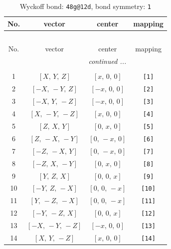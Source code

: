 \documentclass[fleqn,8pt]{jsarticle}
\begin{document}
\begin{longtable}{cccc}
\caption{Wyckoff bond: {\tt 48g@12d}, bond symmetry: {\tt 1}}
 \\
 \hline \hline
No. & vector & center & mapping \\ \hline \endfirsthead

\multicolumn{3}{l}{\tablename\ \thetable{}} \\
 \hline \hline
No. & vector & center & mapping \\ \hline \endhead

 \hline \hline
\multicolumn{3}{r}{\footnotesize\it continued ...} \\ \endfoot

 \hline \hline
\multicolumn{3}{r}{} \\ \endlastfoot

1 & $\left[ X,\, Y,\, Z \right]$ & $\left[ x,\, 0,\, 0 \right]$ & {\tt [1]} \\ \hline
2 & $\left[ - X,\, - Y,\, Z \right]$ & $\left[ - x,\, 0,\, 0 \right]$ & {\tt [2]} \\ \hline
3 & $\left[ - X,\, Y,\, - Z \right]$ & $\left[ - x,\, 0,\, 0 \right]$ & {\tt [3]} \\ \hline
4 & $\left[ X,\, - Y,\, - Z \right]$ & $\left[ x,\, 0,\, 0 \right]$ & {\tt [4]} \\ \hline
5 & $\left[ Z,\, X,\, Y \right]$ & $\left[ 0,\, x,\, 0 \right]$ & {\tt [5]} \\ \hline
6 & $\left[ Z,\, - X,\, - Y \right]$ & $\left[ 0,\, - x,\, 0 \right]$ & {\tt [6]} \\ \hline
7 & $\left[ - Z,\, - X,\, Y \right]$ & $\left[ 0,\, - x,\, 0 \right]$ & {\tt [7]} \\ \hline
8 & $\left[ - Z,\, X,\, - Y \right]$ & $\left[ 0,\, x,\, 0 \right]$ & {\tt [8]} \\ \hline
9 & $\left[ Y,\, Z,\, X \right]$ & $\left[ 0,\, 0,\, x \right]$ & {\tt [9]} \\ \hline
10 & $\left[ - Y,\, Z,\, - X \right]$ & $\left[ 0,\, 0,\, - x \right]$ & {\tt [10]} \\ \hline
11 & $\left[ Y,\, - Z,\, - X \right]$ & $\left[ 0,\, 0,\, - x \right]$ & {\tt [11]} \\ \hline
12 & $\left[ - Y,\, - Z,\, X \right]$ & $\left[ 0,\, 0,\, x \right]$ & {\tt [12]} \\ \hline
13 & $\left[ - X,\, - Y,\, - Z \right]$ & $\left[ - x,\, 0,\, 0 \right]$ & {\tt [13]} \\ \hline
14 & $\left[ X,\, Y,\, - Z \right]$ & $\left[ x,\, 0,\, 0 \right]$ & {\tt [14]} \\ \hline

\end{longtable}
\end{document}
